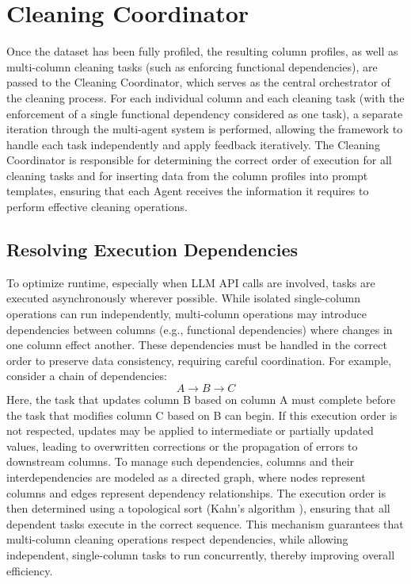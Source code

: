 \section{Cleaning Coordinator}
Once the dataset has been fully profiled, the resulting column profiles, as well as multi-column cleaning tasks (such as enforcing functional dependencies), are passed to the Cleaning Coordinator, which serves as the central orchestrator of the cleaning process.
For each individual column and each cleaning task (with the enforcement of a single functional dependency considered as one task), a separate iteration through the multi-agent system is performed, allowing the framework to handle each task independently and apply feedback iteratively.
The Cleaning Coordinator is responsible for determining the correct order of execution for all cleaning tasks and for inserting data from the column profiles into prompt templates, ensuring that each Agent receives the information it requires to perform effective cleaning operations.

\subsection{Resolving Execution Dependencies}
To optimize runtime, especially when LLM API calls are involved, tasks are executed asynchronously wherever possible. 
While isolated single-column operations can run independently, multi-column operations may introduce dependencies between columns (e.g., functional dependencies) where changes in one column effect another.
These dependencies must be handled in the correct order to preserve data consistency, requiring careful coordination.
For example, consider a chain of dependencies:
\[
A \longrightarrow B \longrightarrow C
\]
Here, the task that updates column B based on column A must complete before the task that modifies column C based on B can begin. 
If this execution order is not respected, updates may be applied to intermediate or partially updated values, leading to overwritten corrections or the propagation of errors to downstream columns.
To manage such dependencies, columns and their interdependencies are modeled as a directed graph, where nodes represent columns and edges represent dependency relationships. 
The execution order is then determined using a topological sort (Kahn's algorithm \cite{KAHN}), ensuring that all dependent tasks execute in the correct sequence.
This mechanism guarantees that multi-column cleaning operations respect dependencies, while allowing independent, single-column tasks to run concurrently, thereby improving overall efficiency.

